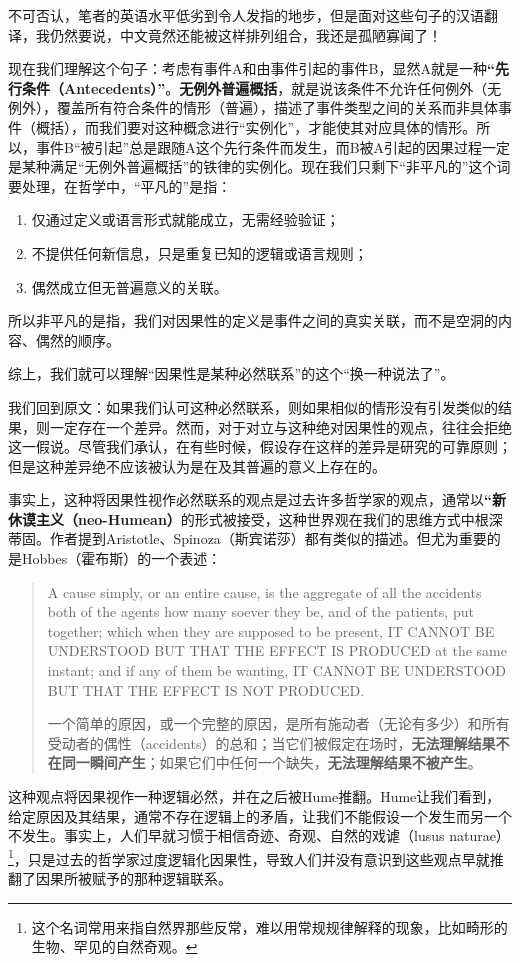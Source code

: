 \documentclass[12pt, a4paper, oneside]{ctexart}
\renewcommand{\b}{\textbf}
\newcommand{\f}{\footnote}
\newcommand{\quo}[1]{\begin{quote}\small{}#1\end{quote}}
\begin{document}
不可否认，笔者的英语水平低劣到令人发指的地步，但是面对这些句子的汉语翻译，我仍然要说，中文竟然还能被这样排列组合，我还是孤陋寡闻了！

现在我们理解这个句子：考虑有事件A和由事件引起的事件B，显然A就是一种\b{“先行条件（Antecedents）”}。\b{无例外普遍概括}，就是说该条件不允许任何例外（无例外），覆盖所有符合条件的情形（普遍），描述了事件类型之间的关系而非具体事件（概括），而我们要对这种概念进行“实例化”，才能使其对应具体的情形。所以，事件B“被引起”总是跟随A这个先行条件而发生，而B被A引起的因果过程一定是某种满足“无例外普遍概括”的铁律的实例化。现在我们只剩下“非平凡的”这个词要处理，在哲学中，“平凡的”是指：
\begin{enumerate}
    \item 仅通过定义或语言形式就能成立，无需经验验证；
    \item 不提供任何新信息，只是重复已知的逻辑或语言规则；
    \item 偶然成立但无普遍意义的关联。
\end{enumerate}

所以非平凡的是指，我们对因果性的定义是事件之间的真实关联，而不是空洞的内容、偶然的顺序。

综上，我们就可以理解“因果性是某种必然联系”的这个“换一种说法了”。

我们回到原文：如果我们认可这种必然联系，则如果相似的情形没有引发类似的结果，则一定存在一个差异。然而，对于对立与这种绝对因果性的观点，往往会拒绝这一假说。尽管我们承认，在有些时候，假设存在这样的差异是研究的可靠原则；但是这种差异绝不应该被认为是在及其普遍的意义上存在的。

事实上，这种将因果性视作必然联系的观点是过去许多哲学家的观点，通常以\b{“新休谟主义（neo-Humean）}的形式被接受，这种世界观在我们的思维方式中根深蒂固。作者提到Aristotle、Spinoza（斯宾诺莎）都有类似的描述。但尤为重要的是Hobbes（霍布斯）的一个表述：
\quo
{A cause simply, or an entire cause, is the aggregate of all the accidents both of the agents how many soever they be, and of the patients, put together; which when they are supposed to be present, IT CANNOT BE UNDERSTOOD BUT THAT THE EFFECT IS PRODUCED at the same instant; and if any of them be wanting, IT CANNOT BE UNDERSTOOD BUT THAT THE EFFECT IS NOT PRODUCED.

一个简单的原因，或一个完整的原因，是所有施动者（无论有多少）和所有受动者的偶性（accidents）的总和；当它们被假定在场时，\b{无法理解结果不在同一瞬间产生}；如果它们中任何一个缺失，\b{无法理解结果不被产生}。
}

这种观点将因果视作一种逻辑必然，并在之后被Hume推翻。Hume让我们看到，给定原因及其结果，通常不存在逻辑上的矛盾，让我们不能假设一个发生而另一个不发生。事实上，人们早就习惯于相信奇迹、奇观、自然的戏谑（lusus naturae）\f{这个名词常用来指自然界那些反常，难以用常规规律解释的现象，比如畸形的生物、罕见的自然奇观。}，只是过去的哲学家过度逻辑化因果性，导致人们并没有意识到这些观点早就推翻了因果所被赋予的那种逻辑联系。
\end{document}
